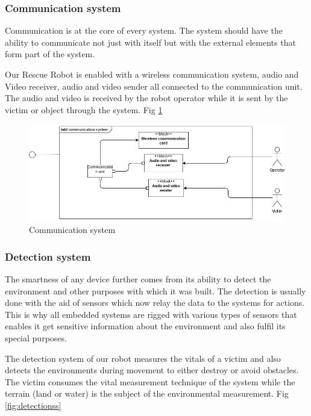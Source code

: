 \documentclass[10pt,journal,compsoc]{IEEEtran}
\begin{document}
\subsubsection{Communication system}

Communication is at the core of every system. The system should have the ability to communicate not just with itself but with the external elements that form part of the system. 

Our Rescue Robot is enabled with a wireless communication system, audio and Video receiver, audio and video sender all connected to the communication unit. The audio and video is received by the robot operator while it is sent by the victim or object through the system. Fig \ref{fig:communicationss}

\begin{figure}[h]
\includegraphics[scale=0.42]{communicationss}
\caption{Communication system}
\label{fig:communicationss}
\end{figure}

\subsubsection{Detection system}

The smartness of any device further comes from its ability to detect the environment and other purposes with which it was built. The detection is usually done with the aid of sensors which now relay the data to the systems for actions. This is why all embedded systems are rigged with various types of sensors that enables it get sensitive information about the environment and also fulfil its special purposes. 

The detection system of our robot measures the vitals of a victim and also detects the environments during movement to either destroy or avoid obstacles. The victim consumes the vital measurement technique of the system while the terrain (land or water) is the subject of the environmental measurement. Fig \ref{fig:detectionss}
\end{document}
